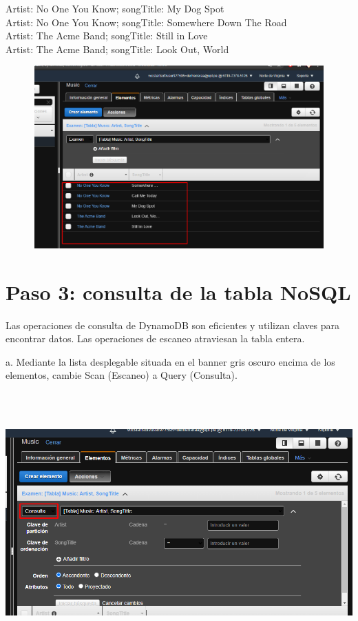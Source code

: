 \documentclass[12pt,letterpaper]{article}
\begin{document}
Artist: No One You Know; songTitle: My Dog Spot
\\Artist: No One You Know; songTitle: Somewhere Down The Road
\\Artist: The Acme Band; songTitle: Still in Love
\\Artist: The Acme Band; songTitle: Look Out, World
\begin{center}
    \includegraphics[width=18cm, height=7cm]{img/2c.png}  
\end{center}

\newpage

\section{Paso 3: consulta de la tabla NoSQL
} 
Las operaciones de consulta de DynamoDB son eficientes y utilizan claves para encontrar datos. Las operaciones de escaneo atraviesan la tabla entera.


a. Mediante la lista desplegable situada en el banner gris oscuro encima de los elementos, cambie Scan (Escaneo) a Query (Consulta). 

\begin{center}
    \includegraphics[width=18cm, height=10cm]{img/3a.png}  
\end{center}
\end{document}
